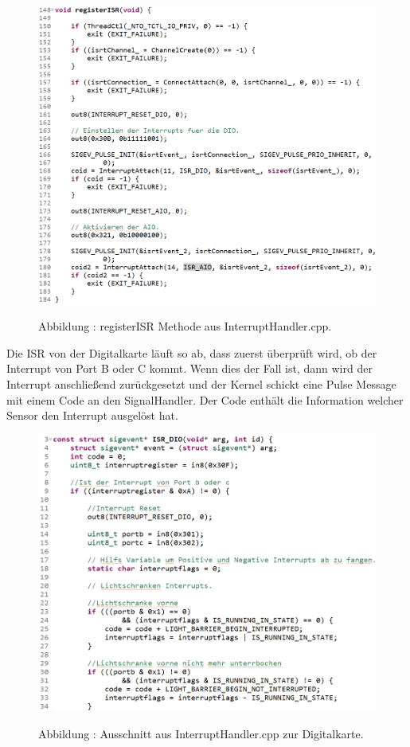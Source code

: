 \documentclass[a4paper, 11pt]{article}
\begin{document}
\begin{figure}[h]
\centering 
    \includegraphics[scale=0.6]{ISR/regisr.png}
    
    \small Abbildung \theimgcounter : registerISR Methode aus InterruptHandler.cpp.
    \label{regisr}
\end{figure}

Die ISR von der Digitalkarte läuft so ab, dass zuerst überprüft wird, ob der Interrupt von Port B oder C kommt. Wenn dies der Fall ist, dann wird der Interrupt anschließend zurückgesetzt und der Kernel schickt eine Pulse Message mit einem Code an den SignalHandler. Der Code enthält die Information welcher Sensor den Interrupt ausgelöst hat.

\newpage

\begin{figure}[h]
\centering 
    \includegraphics[scale=0.7]{ISR/isrdig.png}
    
    \small Abbildung \theimgcounter : Ausschnitt aus InterruptHandler.cpp zur Digitalkarte.
    \label{isrdig}
\end{figure}
\end{document}
